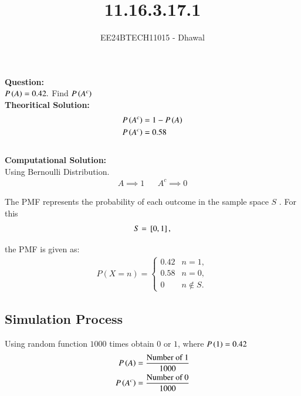 \documentclass[journal]{IEEEtran}
\begin{document}

\vspace{3cm}

\title{11.16.3.17.1}
\author{EE24BTECH11015 - Dhawal}

{\let\newpage\relax\maketitle}

\renewcommand{\thefigure}{\theenumi}
\renewcommand{\thetable}{\theenumi}
\setlength{\intextsep}{10pt} %

\textbf{Question:}\\
$P\left(A\right)=0.42.$ Find $P\left(A^c\right)$\\
	
	\textbf{Theoritical Solution:}
	\begin{align}
		P\left(A^c\right)&=1-P\left(A\right)\\
        P\left(A^c\right)&=0.58
	\end{align}\\
	\textbf{Computational Solution:}\\
	Using Bernoulli Distribution.
    \begin{align}
        A\implies 1  &&  A^c \implies 0
    \end{align}

    The PMF represents the probability of each outcome in the sample space $S$ . For this
\begin{align*}
    S = {}\left[0, 1\right],
\end{align*}

the PMF is given as:
\begin{align}
P(X = n) = 
\begin{cases} 
0.42 & n=1, \\ 
0.58 & n=0, \\ 
0 & n \notin S.
\end{cases}
\end{align}

\subsection*{Simulation Process}
Using random function $1000$ times obtain $0$ or $1$, where $P\left(1\right)=0.42$ 
\begin{align}
    P\left(A\right)=\frac{\text{Number of 1}}{1000}\\
        P\left(A^c\right)=\frac{\text{Number of 0}}{1000}
\end{align}
\end{document}
